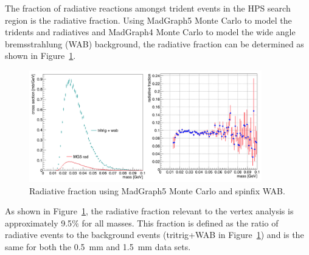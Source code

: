 The fraction of radiative reactions amongst trident events in the HPS search region is the radiative fraction. Using MadGraph5 Monte Carlo to model the tridents and radiatives and MadGraph4 Monte Carlo to model the wide angle bremsstrahlung (WAB) background, the radiative fraction can be determined as shown in Figure~\ref{fig:radFrac}.

\begin{figure}[htb]
  \centering
      \includegraphics[width=0.9\textwidth]{pics/searching/radFrac.png}
  \caption[Radiative fraction from Monte Carlo]{Radiative fraction using MadGraph5 Monte Carlo and spinfix WAB.}
  \label{fig:radFrac}
\end{figure} 

As shown in Figure~\ref{fig:radFrac}, the radiative fraction relevant to the vertex analysis is approximately 9.5$\%$ for all masses. This fraction is defined as the ratio of radiative events to the background events (tritrig+WAB in Figure~\ref{fig:radFrac}) and is the same for both the 0.5~mm and 1.5~mm data sets.
